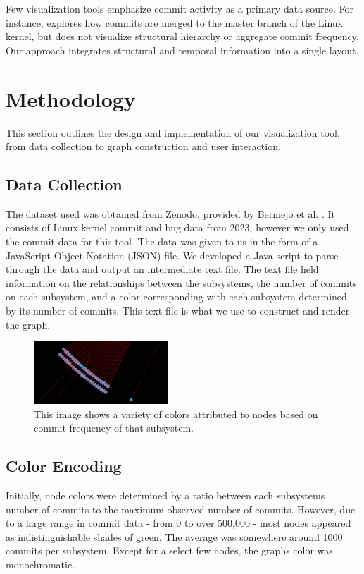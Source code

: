 \documentclass[conference]{IEEEtran}
\begin{document}
Few visualization tools emphasize commit activity as a primary data source. For instance, \cite{merge} explores how commits are merged to the master branch of the Linux kernel, but does not visualize structural hierarchy or aggregate commit frequency. Our approach integrates structural and temporal information into a single layout.

\section{Methodology}
\label{method}

This section outlines the design and implementation of our visualization tool, from data collection to graph construction and user interaction.

\subsection{Data Collection} 
The dataset used was obtained from Zenodo, provided by Bermejo et al. \cite{zenodo}. It consists of Linux kernel commit and bug data from 2023, however we only used the commit data for this tool. The data was given to us in the form of a JavaScript Object Notation (JSON) file. We developed a Java script to parse through the data and output an intermediate text file. The text file held information on the relationships between the subsystems, the number of commits on each subsystem, and a color corresponding with each subsystem determined by its number of commits. This text file is what we use to construct and render the graph.

\begin{figure}[h!]
	\centering
	\includegraphics[width=0.45\textwidth]{randomSection.png}
	\caption{This image shows a variety of colors attributed to nodes based on commit frequency of that subsystem.}
	\label{in}
\end{figure}

\subsection{Color Encoding}
\label{colE}
Initially, node colors were determined by a ratio between each subsystems number of commits to the maximum observed number of commits. However, due to a large range in commit data - from 0 to over 500,000 - most nodes appeared as indistinguishable shades of green. The average was somewhere around 1000 commits per subsystem. Except for a select few nodes, the graphs color was monochromatic.
\end{document}
